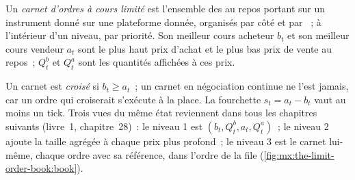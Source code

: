 \begin{definition}\label{def:mx:the-limit-order-book:lob}
Un \emph{carnet d'ordres à cours limité} est l'ensemble des  au repos portant sur un instrument donné sur une plateforme donnée, organisés par côté et par
~; à l'intérieur d'un niveau, par priorité. Son meilleur cours acheteur $b_t$ et son meilleur cours vendeur $a_t$ sont le plus haut prix d'achat et le plus bas prix de vente au repos~;
$Q^b_t$ et $Q^a_t$ sont les quantités affichées à ces prix.
\end{definition}

Un carnet est \emph{croisé} si $b_t\ge a_t$~; un carnet en négociation continue ne l'est jamais, car un ordre qui croiserait s'exécute à la place. La
fourchette $s_t = a_t - b_t$ vaut au moins un tick. Trois vues du même état reviennent dans tous les chapitres suivants (livre~1, chapitre~28)~: le niveau 1 est
$(b_t, Q^b_t, a_t, Q^a_t)$~; le niveau 2 ajoute la taille agrégée à chaque prix plus profond~; le niveau 3 est le carnet lui-même, chaque ordre avec sa référence, dans
l'ordre de la file (\cref{fig:mx:the-limit-order-book:book}).

